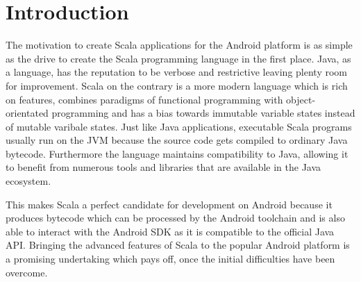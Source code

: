 \section{Introduction}

The motivation to create Scala applications for the Android platform is as simple as the drive to create the Scala 
programming language in the first place. Java, as a language, has the reputation to be verbose and restrictive leaving 
plenty room for improvement. Scala on the contrary is a more modern language which is rich on features, combines 
paradigms of functional programming with object-orientated programming and has a bias towards immutable variable states
instead of mutable varibale states. Just like Java applications, executable Scala programs usually run on the \ac{JVM}
because the source code gets compiled to ordinary Java bytecode. Furthermore the language maintains compatibility to
Java, allowing it to benefit from numerous tools and libraries that are available in the Java ecosystem.

This makes Scala a perfect candidate for development on Android because it produces bytecode which can be processed by
the Android toolchain and is also able to interact with the Android \ac{SDK} as it is compatible to the official Java
\ac{API}. Bringing the advanced features of Scala to the popular Android platform is a promising undertaking which pays
off, once the initial difficulties have been overcome.